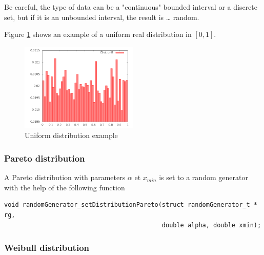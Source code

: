    Be careful, the type of data can be a "continuous" bounded interval
or a discrete set, but if it is an unbounded interval, the result is
\ldots {} random.

   Figure \ref{figure:distuni} shows an example of a uniform real
distribution in $[0, 1]$.

\begin{figure}[h]
\begin{center}
\includegraphics[width=0.5\textwidth]{DistributionUnif.png}
\caption{Uniform distribution example \label{figure:distuni}}
\end{center}
\end{figure}


%
\subsubsection{Pareto distribution}
\label{subsubsection:paretodist}

   A Pareto distribution with parameters  $\alpha$ et $x_{min}$  is
set to a random generator with the help of the following function

\begin{verbatim}
void randomGenerator_setDistributionPareto(struct randomGenerator_t * rg,
                                           double alpha, double xmin);
\end{verbatim}

%
\subsubsection{Weibull distribution}
\label{weibull_dist}

